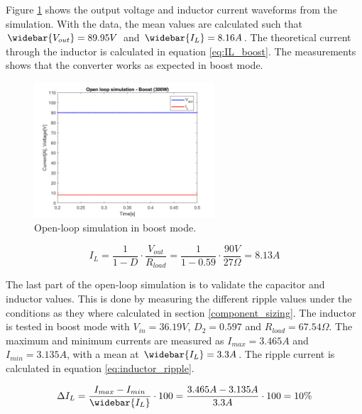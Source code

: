 Figure \ref{fig:OL_boostsimulation} shows the output voltage and inductor current waveforms from the simulation. With the data, the mean values are calculated such that $\widebar{V_{out}} = 89.95V$ and $\widebar{I_L} = 8.16A$. The theoretical current through the inductor is calculated in equation \ref{eq:IL_boost}. The measurements shows that the converter works as expected in boost mode.

\begin{figure}[H]
	\begin{center}
		\includegraphics[width=0.6\textwidth]{../Pictures/P1/Open_loop_simulation/open_loop_boost_300W}
		\caption{Open-loop simulation in boost mode.}
		\label{fig:OL_boostsimulation}
	\end{center}
\end{figure}


\vspace{-0.6cm}
\begin{equation} \label{eq:IL_boost}
	I_L = \frac{1}{1-D} \cdot \frac{V_{out}}{R_{load}} = \frac{1}{1-0.59} \cdot \frac{90V}{27\Omega} = 8.13A
\end{equation}

The last part of the open-loop simulation is to validate the capacitor and inductor values. This is done by measuring the different ripple values under the conditions as they where calculated in section \ref{component_sizing}. The inductor is tested in boost mode with $V_{in} = 36.19V$, $D_{2} = 0.597$ and $R_{load} = 67.54\Omega$. The maximum and minimum currents are measured as $I_{max} = 3.465A$ and $I_{min} = 3.135A$, with a mean at $\widebar{I_L} = 3.3A$. The ripple current is calculated in equation \ref{eq:inductor_ripple}.

\begin{equation} \label{eq:inductor_ripple}
	\Delta I_L = \frac{I_{max}-I_{min}}{\widebar{I_L}} \cdot 100 = \frac{3.465A-3.135A}{3.3A} \cdot 100 = 10\%
\end{equation}

